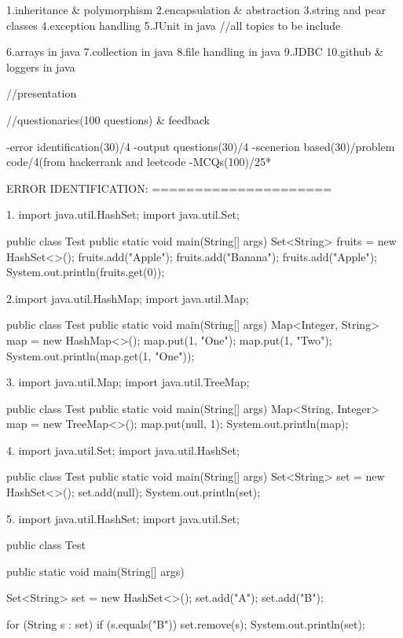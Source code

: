 1.inheritance & polymorphism
2.encapsulation & abstraction
3.string and pear classes
4.exception handling
5.JUnit in java
//all topics to be include

6.arrays in java
7.collection in java
8.file handling in java
9.JDBC
10.github & loggers in java

//presentation

//questionaries(100 questions) & feedback

-error identification(30)/4
-output questions(30)/4
-scenerion based(30)/problem code/4(from hackerrank and leetcode
-MCQs(100)/25*



ERROR IDENTIFICATION:
=====================

1.
import java.util.HashSet;
import java.util.Set;

public class Test {
    public static void main(String[] args) {
        Set<String> fruits = new HashSet<>();
        fruits.add("Apple");
        fruits.add("Banana");
        fruits.add("Apple");
        System.out.println(fruits.get(0));
    }
}


2.import java.util.HashMap;
import java.util.Map;

public class Test {
    public static void main(String[] args) {
        Map<Integer, String> map = new HashMap<>();
        map.put(1, "One");
        map.put(1, "Two");
        System.out.println(map.get(1, "One"));
    }
}


3.
import java.util.Map;
import java.util.TreeMap;

public class Test {
    public static void main(String[] args) {
        Map<String, Integer> map = new TreeMap<>();
        map.put(null, 1);
        System.out.println(map);
    }
}


4.
import java.util.Set;
import java.util.HashSet;

public class Test {
    public static void main(String[] args) {
        Set<String> set = new HashSet<>();
        set.add(null);
        System.out.println(set);
    }
}


5.
import java.util.HashSet;
import java.util.Set;

public class Test {
    public static void main(String[] args) {
        Set<String> set = new HashSet<>();
        set.add("A");
        set.add("B");

        for (String s : set) {
            if (s.equals("B")) {
                set.remove(s);
            }
        }
        System.out.println(set);
    }
}


